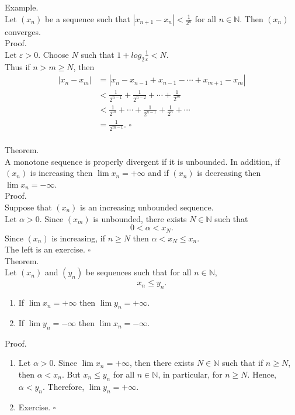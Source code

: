 \documentclass[twocolumn]{article}
\newcommand{\qed}{$\square$}
\newcommand{\br}{\vspace{\baselineskip}}
\let\eps\varepsilon
\newcommand{\naturals}{\mathbb{N}}
\begin{document}
Example. \\
Let $(x_n)$ be a sequence such that $|x_{n + 1} - x_n| < \frac{1}{2^n}$ for all $n \in \naturals$. Then $(x_n)$ converges. \\
Proof. \\
Let $\eps > 0$. Choose $N$ such that $1 + log_2 \frac{1}{\eps} < N$. \\
Thus if $n > m \geq N$, then
\begin{align*}
|x_n - x_m|	&= |x_n - x_{n - 1} + x_{n - 1} - \cdots + x_{m + 1} - x_m| \\
			&< \frac{1}{2^{n - 1}} + \frac{1}{2^{n - 2}} + \cdots + \frac{1}{2^m} \\
			&< \frac{1}{2^m} + \cdots + \frac{1}{2^{n - 1}} + \frac{1}{2^n} + \cdots \\
			&= \frac{1}{2^{m - 1}} \text{. \qed}
\end{align*} \\

Theorem. \\
A monotone sequence is properly divergent if it is unbounded. In addition, if $(x_n)$ is increasing then $\lim x_n = +\infty$ and if $(x_n)$ is decreasing then $\lim x_n = -\infty$. \\
Proof. \\
Suppose that $(x_n)$ is an increasing unbounded sequence. \\
Let $\alpha > 0$. Since $(x_m)$ is unbounded, there exists $N \in \naturals$ such that
$$0 < \alpha < x_N \text{.}$$
Since $(x_n)$ is increasing, if $n \geq N$ then $\alpha < x_N \leq x_n$. \\
The left is an exercise. \qed \\

Theorem. \\
Let $(x_n)$ and $(y_n)$ be sequences such that for all $n \in \naturals$,
$$x_n \leq y_n \text{.}$$
\begin{enumerate}
	\item
	If $\lim x_n = +\infty$ then $\lim y_n = +\infty$.
	\item
	If $\lim y_n = -\infty$ then $\lim x_n = -\infty$.
\end{enumerate}
Proof. \\
\begin{enumerate}
	\item
	Let $\alpha > 0$. Since $\lim x_n = +\infty$, then there exists $N \in \naturals$ such that if $n \geq N$, then $\alpha < x_n$. But $x_n \leq y_n$ for all $n \in \naturals$, in particular, for $n \geq N$. Hence, $\alpha < y_n$. Therefore, $\lim y_n = +\infty$.
	\item
	Exercise. \qed
\end{enumerate} \br
\end{document}
